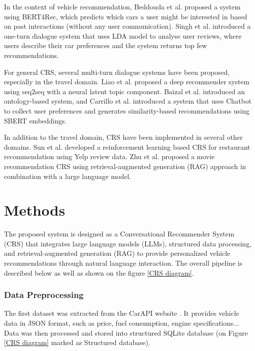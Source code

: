 \documentclass[fleqn,moreauthors,10pt]{ds_report}
\begin{document}
In the context of vehicle recommendation, Beddouda et al. \cite{beddoudavehicle} proposed a system using BERT4Rec, which predicts which cars a user might be interested in based on past interactions (without any user communication). Singh et al. \cite{singh2022car} introduced a one-turn dialogue system that uses LDA model to analyse user reviews, where users describe their car preferences and the system returns top few recommendations.

For general CRS, several multi-turn dialogue systems have been proposed, especially in the travel domain. Liao et al. \cite{liao2019deepconversationalrecommendertravel} proposed a deep recommender system using seq2seq with a neural latent topic component. Baizal et al. \cite{baizal2021tourism} introduced an ontology-based system, and Carrillo et al. \cite{carrillo2023smarttur+} introduced a system that uses Chatbot to collect user preferences and generates similarity-based recommendations using SBERT embeddings.

In addition to the travel domain, CRS have been implemented in several other domains. Sun et al. \cite{sun2018conversational} developed a reinforcement learning based CRS for restaurant recommendation using Yelp review data. Zhu et al. \cite{zhu2025collaborative} proposed a movie recommendation CRS using retrieval-augmented generation (RAG) approach in combination with a large language model.



\section*{Methods}

The proposed system is designed as a Conversational Recommender System (CRS) 
that integrates large language models (LLMs), 
structured data processing, and retrieval-augmented generation (RAG) to provide personalized 
vehicle recommendations through natural 
language interaction. The overall pipeline is described below as well as shown
on the figure \ref{CRS diagram}.


\subsubsection*{Data Preprocessing} \label{data processing}

The first dataset was extracted from the CarAPI website \cite{carapi}. 
It provides vehicle data in JSON format, such as price, fuel consumption, 
engine specifications... Data was then processed and stored into 
structured SQLite database (on Figure \ref{CRS diagram} marked as Structured database). 
\end{document}
